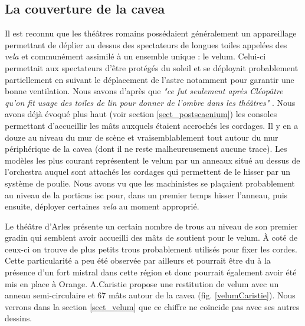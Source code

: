 		
		\subsection{La couverture de la \gls{cavea}} \label{section velum}
		
		Il est reconnu que les théâtres romains possédaient généralement un appareillage permettant de déplier au dessus des spectateurs de longues toiles appelées des \textit{vela} et communément assimilé à un ensemble unique : le \gls{velum}. Celui-ci permettait aux spectateurs d'être protégés du soleil et se déployait probablement partiellement en suivant le déplacement de l'astre notamment pour garantir une bonne ventilation. Nous savons d'après \cite{pline} que \textit{"ce fut seulement après Cléopâtre qu'on fit usage des toiles de lin pour donner de l'ombre dans les théâtres"} \cite{formige}. Nous avons déjà évoqué plus haut (voir section \ref{sect_postscaenium}) les \glspl{console} permettant d'accueillir les mâts auxquels étaient accrochés les cordages. Il y en a douze au niveau du mur de scène et vraisemblablement tout autour du mur périphérique de la \gls{cavea} (dont il ne reste malheureusement aucune trace). Les modèles les plus courant représentent le \gls{velum} par un anneaux situé au dessus de l'\gls{orchestra} auquel sont attachés les cordages qui permettent de le hisser par un système de poulie. Nous avons vu que les machinistes se plaçaient probablement au niveau de la \gls{porticus isc} pour, dans un premier temps hisser l'anneau, puis ensuite, déployer certaines \textit{vela} au moment approprié.  
		
		Le théâtre d'Arles présente un certain nombre de trous au niveau de son premier gradin qui semblent avoir accueilli des mâts de soutient pour le \gls{velum}. \`{A} coté de ceux-ci on trouve de plus petits trous probablement utilisés pour fixer les cordes. Cette particularité a peu été observée par ailleurs et pourrait être du à la présence d'un fort mistral dans cette région et donc pourrait également avoir été mis en place à Orange.
		A.Caristie propose une restitution de \gls{velum} avec un anneau semi-circulaire et 67 mâts autour de la \gls{cavea} (fig. \ref{velumCaristie}). Nous verrons dans la section \ref{sect_velum} que ce chiffre ne coïncide pas avec ses autres dessins.
		
